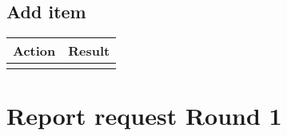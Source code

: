 \documentclass[11pt,a4paper]{article}
\begin{document}
	\subsection{Add item}
\begin{tabular}{|m{7cm}|m{7cm}|}
		\hline \textbf{Action} & \textbf{Result}\\
		\hline & \\
	\end{tabular}
	
	
	\section{Report request Round 1}

	
\end{document}
